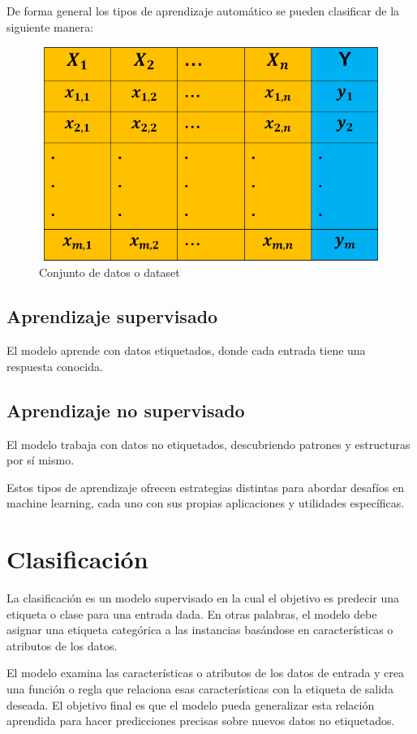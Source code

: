 De forma general los tipos de aprendizaje automático se pueden clasificar de la         
siguiente manera:\medskip

\begin{figure}[H]
    \centering
       \includegraphics[width=12cm, height=7cm ]{Imagenes/TablaML.PNG}
      \caption{Conjunto de datos o dataset}
      \label{fig:Tblml}
  \end{figure} 


\subsection{Aprendizaje supervisado}
El modelo aprende con datos etiquetados, donde cada entrada tiene una respuesta conocida.\medskip

\subsection{Aprendizaje no supervisado}
El modelo trabaja con datos no etiquetados, descubriendo patrones y estructuras por sí mismo.\medskip


Estos tipos de aprendizaje ofrecen estrategias distintas para abordar desafíos en machine 
learning, cada uno con sus propias aplicaciones y utilidades específicas.\bigskip


\section{Clasificación}

La clasificación es un modelo supervisado en la cual el objetivo es predecir una 
etiqueta o clase para una entrada dada. En otras palabras, el modelo debe 
asignar una etiqueta categórica a las instancias basándose en características o 
atributos de los datos. \medskip

El modelo examina las características o atributos de los 
datos de entrada y crea una función o regla que relaciona esas características con la 
etiqueta de salida deseada. El objetivo final es que el modelo pueda generalizar esta 
relación aprendida para hacer predicciones precisas sobre nuevos datos no etiquetados. \medskip

